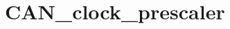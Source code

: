 \hypertarget{group___c_a_n__clock__prescaler}{\section{C\-A\-N\-\_\-clock\-\_\-prescaler}
\label{group___c_a_n__clock__prescaler}
}
